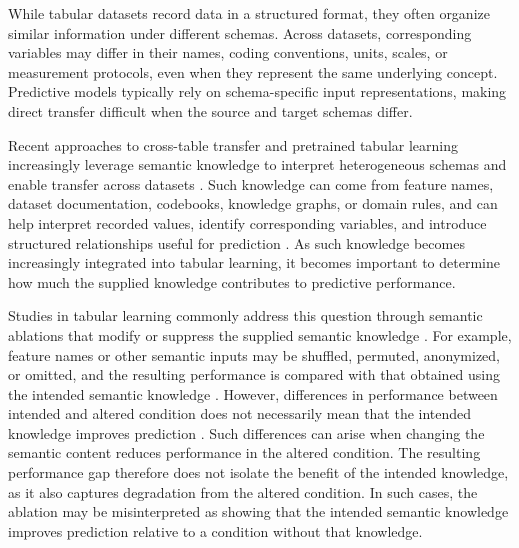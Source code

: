 \documentclass{article} %
\begin{document}
While tabular datasets record data in a structured format, they often organize similar information under different schemas. 
Across datasets, corresponding variables may differ in their names, coding conventions, units, scales, or measurement protocols, even when they represent the same underlying concept. 
Predictive models typically rely on schema-specific input representations, making direct transfer difficult when the source and target schemas differ. 

Recent approaches to cross-table transfer and pretrained tabular learning increasingly leverage semantic knowledge to interpret heterogeneous schemas and enable transfer across datasets \citep{wang2022transtab,kim2024carte,kim2025tarte,arazi2025tabstar}.
Such knowledge can come from feature names, dataset documentation, codebooks, knowledge graphs, or domain rules, and can help interpret recorded values, identify corresponding variables, and introduce structured relationships useful for prediction \citep{pang2015biobankconnect,li2025harmonization,ruiz2023plato,han2024featllm}.
As such knowledge becomes increasingly integrated into tabular learning, it becomes important to determine how much the supplied knowledge contributes to predictive performance. 

Studies in tabular learning commonly address this question through semantic ablations that modify or suppress the supplied semantic knowledge \citep{dinh2022lift,hegselmann2023tabllm}.
For example, feature names or other semantic inputs may be shuffled, permuted, anonymized, or omitted, and the resulting performance is compared with that obtained using the intended semantic knowledge \citep{dinh2022lift,hegselmann2023tabllm}.
However, differences in performance between intended and altered condition does not necessarily mean that the intended knowledge improves prediction \citep{hewitt2019designing,elazar2021amnesic,sturmfels2020visualizing}.
Such differences can arise when changing the semantic content reduces performance in the altered condition.
The resulting performance gap therefore does not isolate the benefit of the intended knowledge, as it also captures degradation from the altered condition.
In such cases, the ablation may be misinterpreted as showing that the intended semantic knowledge improves prediction relative to a condition without that knowledge.
\end{document}
